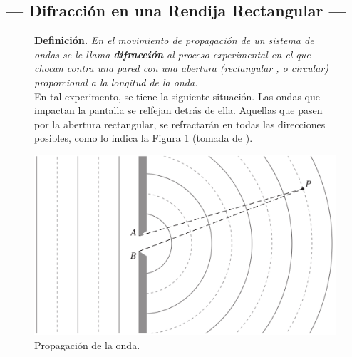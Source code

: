 \documentclass[12pt,a4paper]{article}
\begin{document}
\subsection{--- Difracción en una Rendija Rectangular ---} %
\label{sub:difraccion_una}
\begin{figure}[hbtp!]
\begin{minipage}{0.55\linewidth}
	\textbf{Definición.} \textit{En el movimiento de propagación de un sistema de ondas se le llama \textbf{difracción} al proceso experimental en el que chocan contra una pared con una abertura (rectangular , o circular) proporcional a la longitud de la onda.} \\[2mm]
 	En tal experimento, se tiene la siguiente situación.
	Las ondas que impactan la pantalla se relfejan detrás de ella.
	Aquellas que pasen por la abertura rectangular, se refractarán en todas las direcciones posibles, como lo indica la Figura \ref{fig:rectang} (tomada de ).
\end{minipage}\hspace{5mm}
\begin{minipage}{0.45\linewidth}
	\includegraphics[width= 0.9 \linewidth]{1_INTRO/direcciones.png}
	\caption{Propagación de la onda.}
	\label{fig:rectang}
\end{minipage}
\end{figure}
\end{document}

